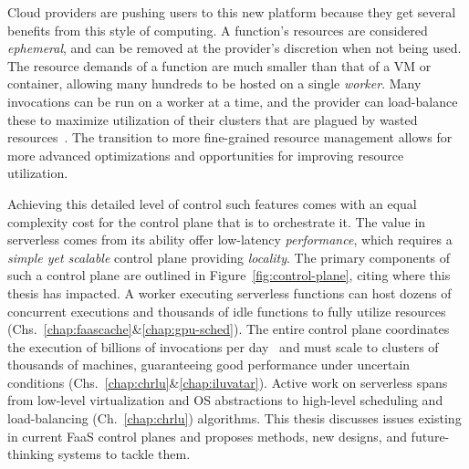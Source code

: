 Cloud providers are pushing users to this new platform because they get several benefits from this style of computing.
A function's resources are considered \emph{ephemeral}, and can be removed at the provider's discretion when not being used.
The resource demands of a function are much smaller than that of a VM or container, allowing many hundreds to be hosted on a single \emph{worker}.
Many invocations can be run on a worker at a time, and the provider can load-balance these to maximize utilization of their clusters that are plagued by wasted resources~\cite{fuerst2020cloud,fuerst2022memory,wang2021smartharvest,serverless-harvest-sosp21,harvest-osdi20}.
The transition to more fine-grained resource management allows for more advanced optimizations and opportunities for improving resource utilization.

Achieving this detailed level of control such features comes with an equal complexity cost for the control plane that is to orchestrate it.
The value in serverless comes from its ability offer low-latency \emph{performance}, which requires a \emph{simple yet scalable} control plane providing \emph{locality}.
The primary components of such a control plane are outlined in Figure~\ref{fig:control-plane}, citing where this thesis has impacted.
A worker executing serverless functions can host dozens of concurrent executions and thousands of idle functions to fully utilize resources (Chs.~\ref{chap:faascache}\&\ref{chap:gpu-sched}).
The entire control plane coordinates the execution of billions of invocations per day~\cite{sahraei2023xfaas} and must scale to clusters of thousands of machines, guaranteeing good performance under uncertain conditions (Chs.~\ref{chap:chrlu}\&\ref{chap:iluvatar}).
Active work on serverless spans from low-level virtualization and OS abstractions to high-level scheduling and load-balancing (Ch.~\ref{chap:chrlu}) algorithms.
This thesis discusses issues existing in current FaaS control planes and proposes methods, new designs, and future-thinking systems to tackle them.

